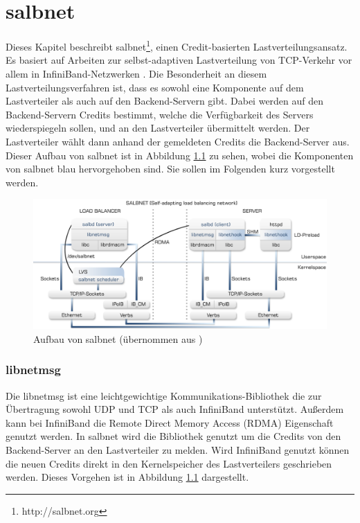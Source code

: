 \documentclass[a4paper, 12pt, BCOR10mm, DIV12, toc=bibliography, toc=listof, german]{scrbook}
\begin{document}

	\chapter{salbnet} %
	\label{cha:salbnet}

		Dieses Kapitel beschreibt salbnet\footnote{http://salbnet.org}, einen Credit-basierten
		Lastverteilungsansatz.  Es basiert auf Arbeiten zur selbst-adaptiven Lastverteilung von
		TCP-Verkehr vor allem in InfiniBand-Netzwerken \cite{zinke2007, scsczile2008,
		schneidenbach2009}. Die Besonderheit an diesem Lastverteilungsverfahren ist, dass es sowohl eine
		Komponente auf dem Lastverteiler als auch auf den Backend-Servern gibt. Dabei werden auf den
		Backend-Servern Credits bestimmt, welche die Verfügbarkeit des Servers wiederspiegeln sollen,
		und an den Lastverteiler übermittelt werden. Der Lastverteiler wählt dann anhand der gemeldeten
		Credits die Backend-Server aus. Dieser Aufbau von salbnet ist in Abbildung \ref{fig:salbnet} zu
		sehen, wobei die Komponenten von salbnet blau hervorgehoben sind. Sie sollen im Folgenden kurz
		vorgestellt werden.

		\begin{figure}
			\centering
			\includegraphics[width=\textwidth]{images/salbnet}
			\caption{Aufbau von salbnet (übernommen aus \cite{zinke2012})}
			\label{fig:salbnet}
		\end{figure}

		\subsection*{libnetmsg} %

			Die libnetmsg \cite{rabweg2009} ist eine leichtgewichtige Kommunikations-Bibliothek die zur
			Übertragung sowohl UDP und TCP als auch InfiniBand unterstützt. Außerdem kann bei InfiniBand
			die Remote Direct Memory Access (RDMA) Eigenschaft genutzt werden. In salbnet wird die
			Bibliothek genutzt um die Credits von den Backend-Server an den Lastverteiler zu melden. Wird
			InfiniBand genutzt können die neuen Credits direkt in den Kernelspeicher des Lastverteilers
			geschrieben werden. Dieses Vorgehen ist in Abbildung \ref{fig:salbnet} dargestellt.
\end{document}
